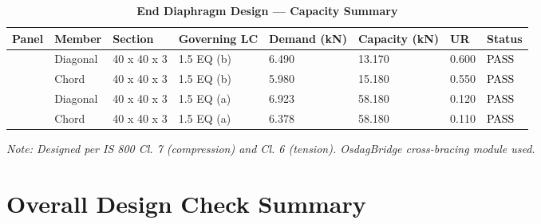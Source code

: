 \documentclass[12pt,a4paper]{report}
\numberwithin{table}{chapter}
\numberwithin{figure}{chapter}
\begin{document}
\vspace{1em}

\begin{longtable}{|C{2.0cm}|L{1.8cm}|C{2.2cm}|C{3.0cm}|C{1.8cm}|C{1.8cm}|C{1.2cm}|C{1.8cm}|}
\caption{\textbf{End Diaphragm Design --- Capacity Summary}}
\\
\hline
\textbf{Panel} & \textbf{Member} & \textbf{Section} & \textbf{Governing LC} & \textbf{Demand (kN)} & \textbf{Capacity (kN)} & \textbf{UR} & \textbf{Status} \\[6pt]
\hline
{} & Diagonal & 40 x 40 x 3 & 1.5 EQ (b) & 6.490 & 13.170 & 0.600 & \textcolor{black}{PASS} \\[6pt]
 & Chord & 40 x 40 x 3 & 1.5 EQ (b) & 5.980 & 15.180 & 0.550 & \textcolor{black}{PASS} \\[6pt]
\hline
{} & Diagonal & 40 x 40 x 3 & 1.5 EQ (a) & 6.923 & 58.180 & 0.120 & \textcolor{black}{PASS} \\[6pt]
 & Chord & 40 x 40 x 3 & 1.5 EQ (a) & 6.378 & 58.180 & 0.110 & \textcolor{black}{PASS} \\[6pt]
\hline
\end{longtable}
\noindent\textit{Note: Designed per IS 800 Cl. 7 (compression) and Cl. 6 (tension). OsdagBridge cross-bracing module used.}

\section{Overall Design Check Summary}
\label{sec:overall-summary}
\end{document}
